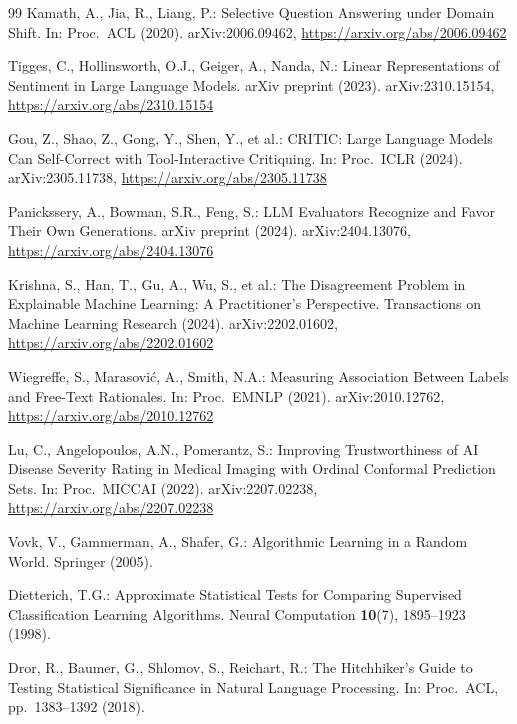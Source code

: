 \documentclass[runningheads]{llncs}
\begin{document}
\begin{thebibliography}{99}
Kamath, A., Jia, R., Liang, P.: Selective Question Answering under Domain Shift. In: Proc.\ ACL (2020). arXiv:2006.09462, \url{https://arxiv.org/abs/2006.09462}


Tigges, C., Hollinsworth, O.J., Geiger, A., Nanda, N.: Linear Representations of Sentiment in Large Language Models. arXiv preprint (2023). arXiv:2310.15154, \url{https://arxiv.org/abs/2310.15154}

Gou, Z., Shao, Z., Gong, Y., Shen, Y., et al.: CRITIC: Large Language Models Can Self-Correct with Tool-Interactive Critiquing. In: Proc.\ ICLR (2024). arXiv:2305.11738, \url{https://arxiv.org/abs/2305.11738}

Panickssery, A., Bowman, S.R., Feng, S.: LLM Evaluators Recognize and Favor Their Own Generations. arXiv preprint (2024). arXiv:2404.13076, \url{https://arxiv.org/abs/2404.13076}

Krishna, S., Han, T., Gu, A., Wu, S., et al.: The Disagreement Problem in Explainable Machine Learning: A Practitioner's Perspective. Transactions on Machine Learning Research (2024). arXiv:2202.01602, \url{https://arxiv.org/abs/2202.01602}

Wiegreffe, S., Marasovi\'{c}, A., Smith, N.A.: Measuring Association Between Labels and Free-Text Rationales. In: Proc.\ EMNLP (2021). arXiv:2010.12762, \url{https://arxiv.org/abs/2010.12762}

Lu, C., Angelopoulos, A.N., Pomerantz, S.: Improving Trustworthiness of AI Disease Severity Rating in Medical Imaging with Ordinal Conformal Prediction Sets. In: Proc.\ MICCAI (2022). arXiv:2207.02238, \url{https://arxiv.org/abs/2207.02238}

Vovk, V., Gammerman, A., Shafer, G.: Algorithmic Learning in a Random World. Springer (2005). 

Dietterich, T.G.: Approximate Statistical Tests for Comparing Supervised Classification Learning Algorithms. Neural Computation \textbf{10}(7), 1895--1923 (1998). 

Dror, R., Baumer, G., Shlomov, S., Reichart, R.: The Hitchhiker's Guide to Testing Statistical Significance in Natural Language Processing. In: Proc.\ ACL, pp.~1383--1392 (2018). 


\end{thebibliography}
\end{document}
